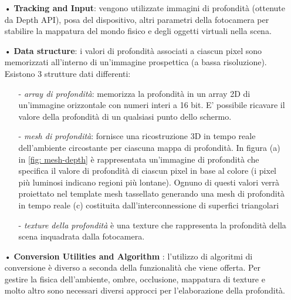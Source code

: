 \documentclass[crop=false, class=book]{standalone}
\begin{document}
		\begin{itemize}
			\item[•] \textbf{ Tracking and Input}: vengono utilizzate immagini di profondità (ottenute da Depth API), posa del dispositivo, altri parametri della fotocamera per stabilire la mappatura del mondo fisico  e degli oggetti virtuali nella scena.
			\item[•] \textbf{Data structure}: i valori di profondità associati a ciascun pixel sono memorizzati all'interno di un'immagine prospettica (a bassa risoluzione).\\
			 Esistono 3 strutture dati differenti:
			\begin{itemize}
				\item[-] \emph{array di profondità}: memorizza la profondità in un array 2D di un'immagine orizzontale con numeri interi a 16 bit. E' possibile ricavare il valore della profondità di un qualsiasi punto dello schermo.
				\item[-] \emph{mesh di profondità}: fornisce una ricostruzione 3D in tempo reale dell'ambiente circostante per ciascuna mappa di profondità. In figura (a) in \vref{fig: mesh-depth} è rappresentata un'immagine di profondità che specifica il valore di profondità di ciascun pixel in base al colore (i pixel più luminosi indicano regioni più lontane). Ognuno di questi valori verrà proiettato nel template mesh tassellato generando una mesh di profondità in tempo reale (c) costituita dall'interconnessione di superfici triangolari  
				\item[-] \emph{texture della profondità} è una texture che rappresenta la profondità della scena inquadrata dalla fotocamera.
			\end{itemize}
			\item[•] \textbf{Conversion Utilities and Algorithm }: l'utilizzo di algoritmi di conversione è diverso a seconda della funzionalità che viene offerta. Per gestire la fisica dell'ambiente, ombre, occlusione, mappatura di texture e molto altro sono necessari diversi approcci per l'elaborazione della profondità.
			

\end{itemize}
\end{document}
